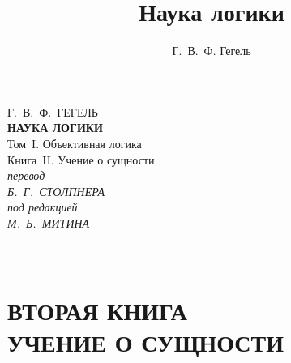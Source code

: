 \documentclass[a5paper, 11pt, twoside, onecolumn, openany]{memoir}
\author{Г.~В.~Ф. Гегель}
\title{Наука логики}
\date{}
\begin{document}
\frontmatter
\pagestyle{empty}

{\centering
  {\Large Г.~В.~Ф.~ГЕГЕЛЬ} \\
  \vspace{130pt}
  \textbf{\Huge НАУКА ЛОГИКИ} \\
  \vspace{60pt}
  {\Large Том~I. Объективная логика} \\
  \vspace{8pt}
  {\large Книга~II. Учение о сущности} \\
  \vspace{70pt}
  \textit{перевод} \\
  \textit{Б.~Г.~СТОЛПНЕРА} \\
  \vspace{10pt}
  \textit{под редакцией} \\
  \textit{М.~Б.~МИТИНА}
\par}

\clearpage

\mainmatter
\pagestyle{plain}


\part[\hspace{38mm}УЧЕНИЕ О СУЩНОСТИ]%
     {\ \\\vspace{200pt}\Large\mdseries ВТОРАЯ КНИГА \\
      \LARGE\bfseries УЧЕНИЕ О СУЩНОСТИ}
\thispagestyle{empty}
\clearpage







\end{document}
